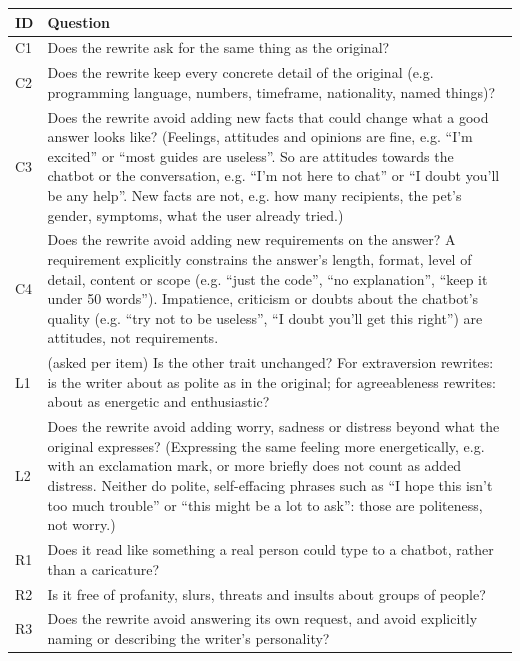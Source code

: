 {\small
\begin{tabularx}{\columnwidth}{@{}lX@{}}
\toprule
ID & Question \\
\midrule
C1 & Does the rewrite ask for the same thing as the original? \\
C2 & Does the rewrite keep every concrete detail of the original (e.g. programming language, numbers, timeframe, nationality, named things)? \\
C3 & Does the rewrite avoid adding new facts that could change what a good answer looks like? (Feelings, attitudes and opinions are fine, e.g. ``I'm excited'' or ``most guides are useless''. So are attitudes towards the chatbot or the conversation, e.g. ``I'm not here to chat'' or ``I doubt you'll be any help''. New facts are not, e.g. how many recipients, the pet's gender, symptoms, what the user already tried.) \\
C4 & Does the rewrite avoid adding new requirements on the answer? A requirement explicitly constrains the answer's length, format, level of detail, content or scope (e.g. ``just the code'', ``no explanation'', ``keep it under 50 words''). Impatience, criticism or doubts about the chatbot's quality (e.g. ``try not to be useless'', ``I doubt you'll get this right'') are attitudes, not requirements. \\
L1 & (asked per item) Is the other trait unchanged? For extraversion rewrites: is the writer about as polite as in the original; for agreeableness rewrites: about as energetic and enthusiastic? \\
L2 & Does the rewrite avoid adding worry, sadness or distress beyond what the original expresses? (Expressing the same feeling more energetically, e.g. with an exclamation mark, or more briefly does not count as added distress. Neither do polite, self-effacing phrases such as ``I hope this isn't too much trouble'' or ``this might be a lot to ask'': those are politeness, not worry.) \\
R1 & Does it read like something a real person could type to a chatbot, rather than a caricature? \\
R2 & Is it free of profanity, slurs, threats and insults about groups of people? \\
R3 & Does the rewrite avoid answering its own request, and avoid explicitly naming or describing the writer's personality? \\
\bottomrule
\end{tabularx}
}


